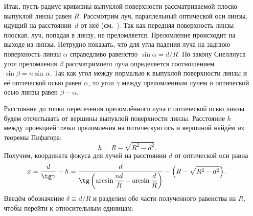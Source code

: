 Итак, пусть радиус кривизны выпуклой поверхности рассматриваемой плос\-ко-вы\-пук\-лой линзы равен $R$. Рассмотрим луч, параллельный оптической оси линзы, идущий на расстоянии~$d$ от неё (см.~). Так как передняя поверхность линзы плоская, луч, попадая в линзу, не преломляется. Преломление происходит на выходе из линзы. Нетрудно показать, что для угла падения луча на заднюю поверхность линзы $\alpha$ справедливо равенство $\sin \alpha = d/R$. По закону Снеллиуса угол преломления $\beta$ рассматримоего луча  определяется соотношением $\sin \beta = n \sin \alpha$. Так как угол между нормалью к выпуклой поверхности линзы и её оптической осью равен $\alpha$, то угол $\gamma$ между преломленным лучем и оптической осью линзы равен $\beta - \alpha$.

Расстояние до точки пересечения преломлённого луча с оптической осью линзы будем отсчитывать от вершины выпуклой поверхности линзы. Расстояние $h$ между проекцией точки преломления на оптическую ось и вершиной найдём из теоремы Пифагора:
\begin{equation*}
    h = R - \sqrt{R^2 - d^2}.
\end{equation*}
Получим, координата фокуса для лучей на расстоянии $d$ от оптической оси равна
\begin{equation}
    x = \frac{d}{\tg \gamma} - h = \frac{d}{\tg \left( \arcsin \dfrac{n d}{R} - \arcsin \dfrac{d}{R} \right)} - \left( R - \sqrt{R^2 - d^2} \right).
    \label{eq:optics-aberr-x(d)}
\end{equation}
Введём обозначение $\delta \equiv d/R$ и разделим обе части полученного равенства на $R$, чтобы перейти к относительным единицам:
